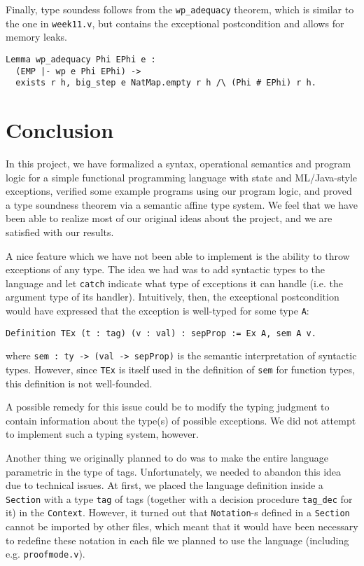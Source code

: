 \documentclass{article}
\begin{document}
Finally, type soundess follows from the \texttt{wp\_adequacy} theorem, which is similar to the one in \texttt{week11.v},
but contains the exceptional postcondition and allows for memory leaks.
\begin{lstlisting}
Lemma wp_adequacy Phi EPhi e :
  (EMP |- wp e Phi EPhi) ->
  exists r h, big_step e NatMap.empty r h /\ (Phi # EPhi) r h.
\end{lstlisting}

\section{Conclusion}

In this project, we have formalized a syntax, operational semantics and program logic for a simple functional programming language
with state and ML/Java-style exceptions, verified some example programs using our program logic, and proved a type soundness theorem
via a semantic affine type system. We feel that we have been able to realize most of our original ideas about the project, and we are satisfied
with our results.

A nice feature which we have not been able to implement is the ability to throw exceptions of any type. The idea we had was to add syntactic types to the
language and let \texttt{catch} indicate what type of exceptions it can handle (i.e. the argument type of its handler). Intuitively, then, the exceptional
postcondition would have expressed that the exception is well-typed for some type \texttt{A}:
\begin{lstlisting}
Definition TEx (t : tag) (v : val) : sepProp := Ex A, sem A v.
\end{lstlisting}
where \texttt{sem : ty -> (val -> sepProp)} is the semantic interpretation of syntactic types. However, since \texttt{TEx} is itself used in the definition of
\texttt{sem} for function types, this definition is not well-founded.

A possible remedy for this issue could be to modify the typing judgment to contain information about the type(s) of possible exceptions. We did not attempt
to implement such a typing system, however.

Another thing we originally planned to do was to make the entire language parametric in the type of tags. Unfortunately, we needed to abandon this idea due
to technical issues. At first, we placed the language definition inside a \texttt{Section} with a type \texttt{tag} of tags
(together with a decision procedure \texttt{tag\_dec} for it) in the \texttt{Context}. However, it turned out that \texttt{Notation}-s defined in a \texttt{Section}
cannot be imported by other files, which meant that it would have been necessary to redefine these notation in each file we planned to use the language
(including e.g. \texttt{proofmode.v}).
\end{document}
